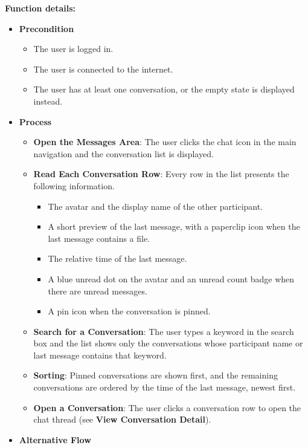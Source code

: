 \textbf{Function details:}

\begin{itemize}[leftmargin=1.6em,topsep=4pt,itemsep=3pt,parsep=0pt,label=$\bullet$]
    \item \textbf{Precondition}

        \begin{itemize}[leftmargin=2.2em,topsep=2pt,itemsep=3pt,parsep=0pt,label=$\circ$]
            \item The user is logged in.
            \item The user is connected to the internet.
            \item The user has at least one conversation, or the empty state is displayed instead.
        \end{itemize}
    \item \textbf{Process}

        \begin{itemize}[leftmargin=2.2em,topsep=2pt,itemsep=3pt,parsep=0pt,label=$\circ$]
            \item \textbf{Open the Messages Area}: The user clicks the chat icon in the main navigation and the conversation list is displayed.
            \item \textbf{Read Each Conversation Row}: Every row in the list presents the following information.
                \begin{itemize}[leftmargin=2.2em,topsep=2pt,itemsep=3pt,parsep=0pt,label=$\blacksquare$]
                    \item The avatar and the display name of the other participant.
                    \item A short preview of the last message, with a paperclip icon when the last message contains a file.
                    \item The relative time of the last message.
                    \item A blue unread dot on the avatar and an unread count badge when there are unread messages.
                    \item A pin icon when the conversation is pinned.
                \end{itemize}
            \item \textbf{Search for a Conversation}: The user types a keyword in the search box and the list shows only the conversations whose participant name or last message contains that keyword.
            \item \textbf{Sorting}: Pinned conversations are shown first, and the remaining conversations are ordered by the time of the last message, newest first.
            \item \textbf{Open a Conversation}: The user clicks a conversation row to open the chat thread (see \textbf{View Conversation Detail}).
        \end{itemize}
    \item \textbf{Alternative Flow}


\end{itemize}
